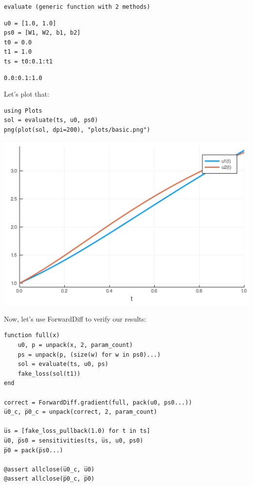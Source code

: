 \documentclass[11pt]{article}
\begin{document}
\begin{verbatim}
evaluate (generic function with 2 methods)
\end{verbatim}


\begin{verbatim}
u0 = [1.0, 1.0]
ps0 = [W1, W2, b1, b2]
t0 = 0.0
t1 = 1.0
ts = t0:0.1:t1
\end{verbatim}

\begin{verbatim}
0.0:0.1:1.0
\end{verbatim}


Let's plot that:
\begin{verbatim}
using Plots
sol = evaluate(ts, u0, ps0)
png(plot(sol, dpi=200), "plots/basic.png")
\end{verbatim}

\begin{center}
\includegraphics[width=.9\linewidth]{plots/basic.png}
\end{center}

Now, let's use ForwardDiff to verify our results:

\begin{verbatim}
function full(x)
    u0, p = unpack(x, 2, param_count)
    ps = unpack(p, (size(w) for w in ps0)...)
    sol = evaluate(ts, u0, ps)
    fake_loss(sol(t1))
end

correct = ForwardDiff.gradient(full, pack(u0, ps0...))
u̅0_c, p̅0_c = unpack(correct, 2, param_count)

u̅s = [fake_loss_pullback(1.0) for t in ts]
u̅0, p̅s0 = sensitivities(ts, u̅s, u0, ps0)
p̅0 = pack(p̅s0...)

@assert allclose(u̅0_c, u̅0)
@assert allclose(p̅0_c, p̅0)
\end{verbatim}
\end{document}
